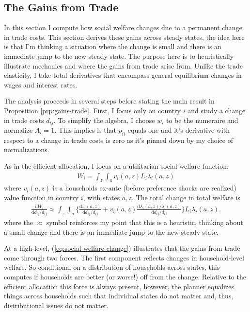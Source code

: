 \documentclass[12pt,pdftex]{article}
\begin{document}
\begin{onehalfspacing}
\subsection{The Gains from Trade}

In this section I compute how social welfare changes due to a permanent change in trade costs. This section derives these gains across steady states, the idea here is that I'm thinking a situation where the change is small and there is an immediate jump to the new steady state. The purpose here is to heuristically illustrate mechanics and where the gains from trade arise from. Unlike the trade elasticity, I take total derivatives that encompass general equilibrium changes in wages and interest rates.

The analysis proceeds in several steps before stating the main result in Proposition \ref{prp:gains-trade}. First, I focus only on country $i$ and study a change in trade costs $d_{ij}$. To simplify the algebra, I choose $w_i$ to be the numeraire and normalize $A_i = 1$. This implies is that $p_{ii}$ equals one and it's derivative with respect to a change in trade costs is zero as it's pinned down by my choice of normalizations.

As in the efficient allocation, I focus on a utilitarian social welfare function:
\begin{align}
W_{i} = \int_{z} \int_{a}  v_{i}(a,z) L_i \lambda_{i}(a,z)
\label{eq:apx-social-welfare}
\end{align}
where $v_{i}(a,z)$ is a households ex-ante (before preference shocks are realized) value function in country $i$, with states $a,z$. The total change in total welfare is
\begin{align}
\frac{\mathrm{d} W_{i}}{\mathrm{d} d_{ij} / d_{ij}} \approx \int_{z} \int_{a} \bigg \{ \frac{\mathrm{d} v_i(a, z)}{\mathrm{d} d_{ij} / d_{ij}}  + v_{i}(a,z) \frac{\mathrm{d} \lambda_{i}(a,z)/ \lambda_{i}(a,z)}{\mathrm{d} d_{ij} / d_{ij}}  \bigg \} L_i \lambda_{i}(a,z).
\label{eq:social-welfare-change}
\end{align}
where the $\approx$ symbol reinforces my point that this is a heuristic, thinking about a small change and there is an immediate jump to the new steady state.

At a high-level, (\ref{eq:social-welfare-change}) illustrates that the gains from trade come through two forces. The first component reflects changes in household-level welfare. So conditional on a distribution of households across states, this computes if households are better (or worse!) off from the change. Relative to the efficient allocation this force is always present, however, the planner equalizes things across households such that individual states do not matter and, thus, distributional issues do not matter.


\end{onehalfspacing}
\end{document}
